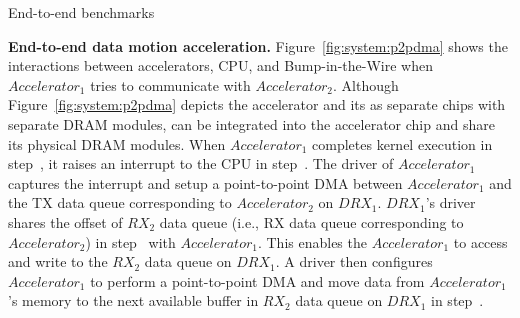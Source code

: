 \begin{table*}[ht!]
    \centering
    \resizebox{\textwidth}{!}{%
    \footnotesize{
    }}
    \caption{End-to-end benchmarks}
    \label{table:benchmark}
\end{table*}

\noindent \textbf{End-to-end data motion acceleration.}
Figure~\ref{fig:system:p2pdma} shows the interactions between accelerators, CPU, and Bump-in-the-Wire \drx when $Accelerator_{1}$ tries to communicate with $Accelerator_{2}$. Although Figure~\ref{fig:system:p2pdma} depicts the accelerator and its \drx as separate chips with separate DRAM modules, \drx can be integrated into the accelerator chip and share its physical DRAM modules. %
%
%
%
%
When $Accelerator_{1}$ completes kernel execution in step~, it raises an interrupt to the CPU in step~. The driver of $Accelerator_{1}$ captures the interrupt and setup a point-to-point DMA between $Accelerator_{1}$ and the TX data queue corresponding to $Accelerator_{2}$ on $DRX_{1}$.
%
$DRX_{1}$'s driver shares the offset of $RX_{2}$ data queue (i.e., RX data queue corresponding to $Accelerator_{2}$) in step~ with $Accelerator_{1}$.
%
This enables the $Accelerator_{1}$ to access and write to the $RX_{2}$ data queue on $DRX_{1}$.
%
A \drx driver then configures $Accelerator_{1}$ to perform a point-to-point DMA and move data from $Accelerator_{1}$'s memory to the next available buffer in $RX_{2}$ data queue on $DRX_{1}$ in step~.
%
